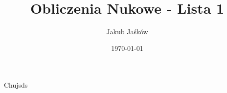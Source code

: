 \documentclass[11pt]{article}
\title{Obliczenia Nukowe - Lista 1}
\author{Jakub Jaśków}
\date{\today}
\begin{document}
\maketitle
Chujsds
\end{document}
